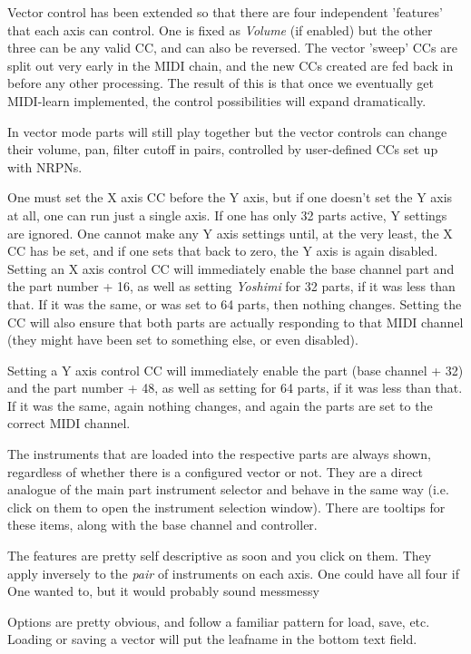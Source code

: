    Vector control has been extended so that there are four independent
   'features' that each axis can control. One is fixed as \textsl{Volume} (if
   enabled) but the other three can be any valid CC, and can also be reversed.
   The vector 'sweep' CCs are split out very early in the MIDI chain, and the
   new CCs created are fed back in before any other processing. The result of
   this is that once we eventually get MIDI-learn implemented, the control
   possibilities will expand dramatically.

   In vector mode parts will still play together but the vector controls can
   change their volume, pan, filter cutoff in pairs, controlled by user-defined
   CCs set up with NRPNs.

   One must set the X axis CC before the Y axis, but if one doesn't set the Y
   axis at all, one can run just a single axis.  If one has only 32 parts
   active, Y settings are ignored.  One cannot make any Y axis settings until,
   at the very least, the X CC has be set, and if one sets that back to zero,
   the Y axis is again disabled.  Setting an X axis control CC will immediately
   enable the base channel part and the part number + 16, as well as setting
   \textsl{Yoshimi} for 32 parts, if it was less than that. If it was the same,
   or was set to 64 parts, then nothing changes. Setting the CC will also
   ensure that both parts are actually responding to that MIDI channel (they
   might have been set to something else, or even disabled).

   Setting a Y axis control CC will immediately enable the part (base channel +
   32) and the part number + 48, as well as setting for 64 parts, if it was
   less than that. If it was the same, again nothing changes, and again the
   parts are set to the correct MIDI channel.

   The instruments that are loaded into the respective parts are always shown,
   regardless of whether there is a configured vector or not. They are a direct
   analogue of the main part instrument selector and behave in the same way
   (i.e.  click on them to open the instrument selection window).  There are
   tooltips for these items, along with the base channel and controller.

   The features are pretty self descriptive as soon and you click on them. They
   apply inversely to the \textsl{pair} of instruments on each axis.  One could
   have all four if One wanted to, but it would probably sound messmessy

   Options are pretty obvious, and follow a familiar pattern for load, save,
   etc.  Loading or saving a vector will put the leafname in the bottom text
   field.

